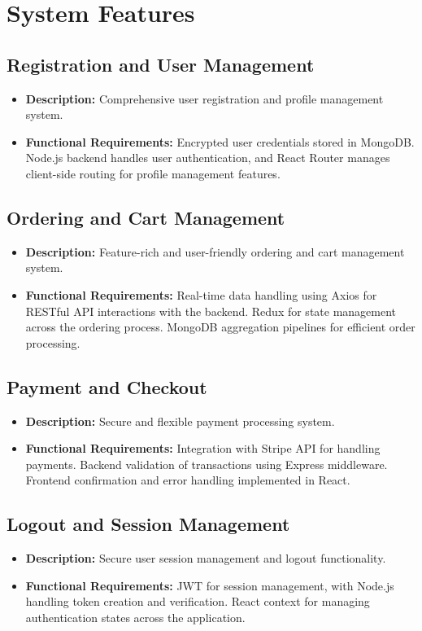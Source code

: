 \documentclass{article}
\begin{document}
\newpage
\section{System Features}
\subsection{Registration and User Management}
\begin{itemize}
    \item \textbf{Description:} Comprehensive user registration and profile management system.
    \item \textbf{Functional Requirements:} Encrypted user credentials stored in MongoDB. Node.js backend handles user authentication, and React Router manages client-side routing for profile management features.
\end{itemize}

\subsection{Ordering and Cart Management}
\begin{itemize}
    \item \textbf{Description:} Feature-rich and user-friendly ordering and cart management system.
    \item \textbf{Functional Requirements:} Real-time data handling using Axios for RESTful API interactions with the backend. Redux for state management across the ordering process. MongoDB aggregation pipelines for efficient order processing.
\end{itemize}

\subsection{Payment and Checkout}
\begin{itemize}
    \item \textbf{Description:} Secure and flexible payment processing system.
    \item \textbf{Functional Requirements:} Integration with Stripe API for handling payments. Backend validation of transactions using Express middleware. Frontend confirmation and error handling implemented in React.
\end{itemize}

\subsection{Logout and Session Management}
\begin{itemize}
    \item \textbf{Description:} Secure user session management and logout functionality.
    \item \textbf{Functional Requirements:} JWT for session management, with Node.js handling token creation and verification. React context for managing authentication states across the application.
\end{itemize}
\end{document}
